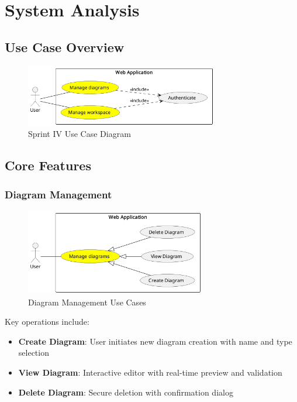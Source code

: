 \section{System Analysis}

\subsection{Use Case Overview}

\begin{figure}[H]
\centering
\includegraphics[width=0.75\textwidth]{conception/SprintIV/use_case_diagrams/use_case_diagram_of_SprintIV.png}
\caption{Sprint IV Use Case Diagram}
\end{figure}

\subsection{Core Features}

\subsubsection{Diagram Management}
\begin{figure}[H]
\centering
\includegraphics[width=0.7\textwidth]{conception/SprintIV/use_case_diagrams/refined_use_case_feature_diagram_management.png}
\caption{Diagram Management Use Cases}
\end{figure}

Key operations include:
\begin{itemize}
    \item \textbf{Create Diagram}: User initiates new diagram creation with name and type selection
    \item \textbf{View Diagram}: Interactive editor with real-time preview and validation
    \item \textbf{Delete Diagram}: Secure deletion with confirmation dialog
\end{itemize}


